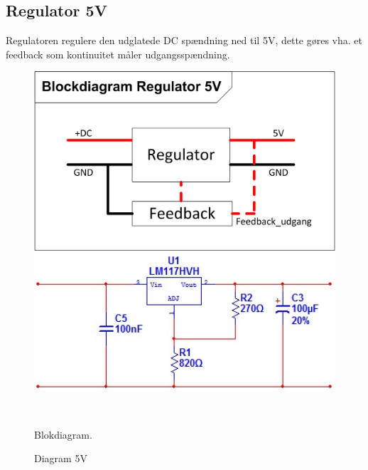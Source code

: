\subsection{Regulator 5V}
Regulatoren regulere den udglatede DC spændning ned til 5V, dette gøres vha. et feedback som kontinuitet måler udgangsspændning. 
\begin{figure}[htbp] \centering
\begin{minipage}[c]{0.48\textwidth} \centering
\includegraphics[width=1.00\textwidth]{billeder/Regulering_5VBlok.jpg} 
\end{minipage} \hfill
\begin{minipage}[c]{0.48\textwidth} \centering
\includegraphics[width=1.00\textwidth]{billeder/Regulator_5V.jpg} 
\end{minipage} \\ 
\begin{minipage}[b]{0.48\textwidth}
\caption{Blokdiagram.} 
\label{fig:Blokdiagram_5V}
\end{minipage} \hfill
\begin{minipage}[b]{0.48\textwidth}
\caption{Diagram 5V} 
\label{fig:billede2}
\end{minipage}
\end{figure}

